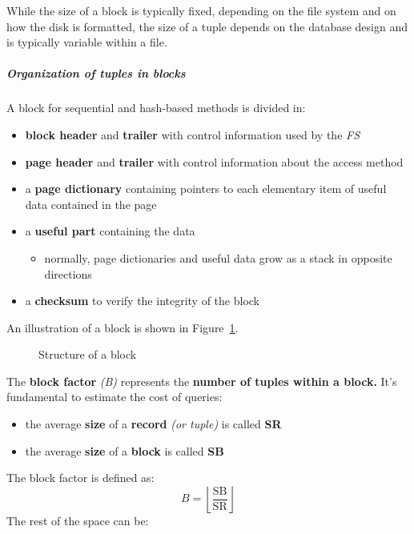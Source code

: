 \documentclass[english]{article}
\begin{document}
While the size of a block is typically fixed, depending on the file system and on how the disk is formatted, the size of a tuple depends on the database design and is typically variable within a file.

\subparagraph*{Organization of tuples in blocks}

A block for sequential and hash-based methods is divided in:

\begin{itemize}
  \item \textbf{block header} and \textbf{trailer} with control information used by the \textit{FS}
  \item \textbf{page header} and \textbf{trailer} with control information about the access method
  \item a \textbf{page dictionary} containing pointers to each elementary item of useful data contained in the page
  \item a \textbf{useful part} containing the data
        \begin{itemize}
          \item normally, page dictionaries and useful data grow as a stack in opposite directions
        \end{itemize}
  \item a \textbf{checksum} to verify the integrity of the block
\end{itemize}

An illustration of a block is shown in Figure~\ref{fig:block-structure}.

\begin{figure}[htbp]
  \centering
  \bigskip
  \caption{Structure of a block}
  \label{fig:block-structure}
  \bigskip
\end{figure}

\bigskip
The \textbf{block factor} \textit{(B)} represents the \textbf{number of tuples within a block.}
It's fundamental to estimate the cost of queries:

\begin{itemize}
  \item the average \textbf{size} of a \textbf{record} \textit{(or tuple)} is called \textbf{SR}
  \item the average \textbf{size} of a \textbf{block} is called \textbf{SB}
\end{itemize}

The block factor is defined as:
\[ B = \left\lfloor \frac{\text{SB}}{\text{SR}} \right\rfloor \]
The rest of the space can be:
\end{document}
